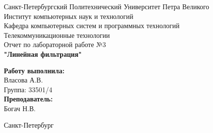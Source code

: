 \documentclass[a4paper]{article}
\begin{document}

\begin{titlepage}	%

	\begin{center}		%

		\large Санкт-Петербургский Политехнический Университет Петра Великого\\
		\large Институт компьютерных наук и технологий \\
		\large Кафедра компьютерных систем и программных технологий\\[6cm]
		
		\huge Телекоммуникационные технологии\\[0.5cm] %
		\large Отчет по лабораторной работе №3 \\[0.2cm]
		\large\textbf{"Линейная фильтрация"}\\[5cm]

	\end{center}


	\begin{flushright} %
		\begin{minipage}{0.25\textwidth} %
			\begin{flushleft} %

				\large\textbf{Работу выполнила:}\\
				\large Власова А.В.\\
				\large {Группа:} 33501/4\\
				
				\large \textbf{Преподаватель:}\\
				\large Богач Н.В.\

			\end{flushleft}
		\end{minipage}
	\end{flushright}
	
	\vfill %

	\begin{center}
	\large Санкт-Петербург\\
	\large \the\year %
	\end{center} %

\thispagestyle{empty} %
\end{titlepage} %
\end{document}
